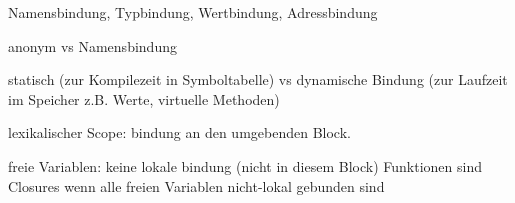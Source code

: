 Namensbindung, Typbindung, Wertbindung, Adressbindung

anonym vs Namensbindung

statisch (zur Kompilezeit in Symboltabelle) vs dynamische Bindung (zur Laufzeit im Speicher z.B. Werte, virtuelle Methoden)

lexikalischer Scope: bindung an den umgebenden Block.

freie Variablen: keine lokale bindung (nicht in diesem Block)
Funktionen sind Closures wenn alle freien Variablen nicht-lokal gebunden sind

